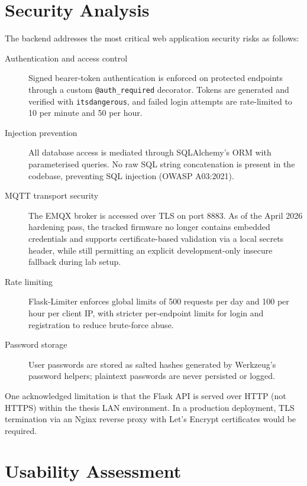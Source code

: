 \section{Security Analysis}

The backend addresses the most critical web application security risks as follows:

\begin{description}
    \item[Authentication and access control] Signed bearer-token authentication is
    enforced on protected endpoints through a custom \texttt{@auth\_required}
    decorator. Tokens are generated and verified with \texttt{itsdangerous}, and
    failed login attempts are rate-limited to 10 per minute and 50 per hour.

    \item[Injection prevention] All database access is mediated through SQLAlchemy's
    ORM with parameterised queries. No raw SQL string concatenation is present in
    the codebase, preventing SQL injection (OWASP A03:2021).

    \item[MQTT transport security] The EMQX broker is accessed over TLS on port
    8883. As of the April 2026 hardening pass, the tracked firmware no longer
    contains embedded credentials and supports certificate-based validation via a
    local secrets header, while still permitting an explicit development-only
    insecure fallback during lab setup.

    \item[Rate limiting] Flask-Limiter enforces global limits of 500 requests per
    day and 100 per hour per client IP, with stricter per-endpoint limits for login
    and registration to reduce brute-force abuse.

    \item[Password storage] User passwords are stored as salted hashes generated
    by Werkzeug's password helpers; plaintext passwords are never persisted or logged.
\end{description}

One acknowledged limitation is that the Flask API is served over HTTP (not HTTPS)
within the thesis LAN environment. In a production deployment, TLS termination
via an Nginx reverse proxy with Let's Encrypt certificates would be required.

\section{Usability Assessment}

